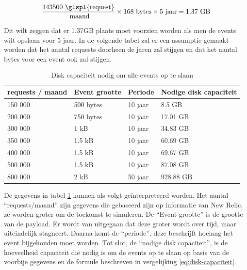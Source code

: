 \begin{equation} \label{eq:disk-capaciteit}
\frac{143 500 \text{ \glspl{request}}}{\text{ maand}} \times 168 \text{ bytes} \times 5 \text{ jaar} = 1.37 \text{ GB} 
\end{equation}

Dit wilt zeggen dat er 1.37GB plaats moet voorzien worden als men de events wilt opslaan voor 5 jaar. In de volgende tabel zal er een assumptie gemaakt worden dat het aantal \glspl{request} doorheen de jaren zal stijgen en dat het aantal bytes voor een event ook zal stijgen.

\begin{table}[h]
\centering
\caption[Disk capaciteit nodig om alle events op te slaan]{Disk capaciteit nodig om alle events op te slaan\footnotemark}
\begin{tabular}{@{}llll@{}}
\toprule
\Glspl{request} / maand & Event grootte & Periode & Nodige disk capaciteit \\ \midrule
150 000 & 500 bytes & 10 jaar & 8.5 GB \\
200 000 & 750 bytes & 10 jaar & 17.01 GB \\
300 000 & 1 kB & 10 jaar & 34.83 GB \\
350 000 & 1.5 kB & 10 jaar & 60.69 GB \\
400 000 & 1.5 kB & 10 jaar & 69.67 GB \\
500 000 & 1.5 kB & 10 jaar & 87.08 GB \\ \midrule
800 000 & 2 kB & 50 jaar & 928.88 GB \\ \bottomrule
\end{tabular}
\label{disk-capaciteit}
\end{table}


De gegevens in tabel \ref{disk-capaciteit} kunnen als volgt geïnterpreteerd worden. Het aantal ``\glspl{request}/maand'' zijn gegevens die gebaseerd zijn op informatie van New Relic, ze worden groter om de toekomst te simuleren. De ``Event grootte'' is de grootte van de \gls{payload}. Er wordt van uitgegaan dat deze groter wordt over tijd, maar uiteindelijk stagneert. Daarna komt de ``periode'', deze beschrijft hoelang het event bijgehouden moet worden. Tot slot, de ``nodige disk capaciteit'', is de hoeveelheid capaciteit die nodig is om de events op te slaan op basis van de voorbije gegevens en de formule beschreven in vergelijking \ref{eq:disk-capaciteit}.

